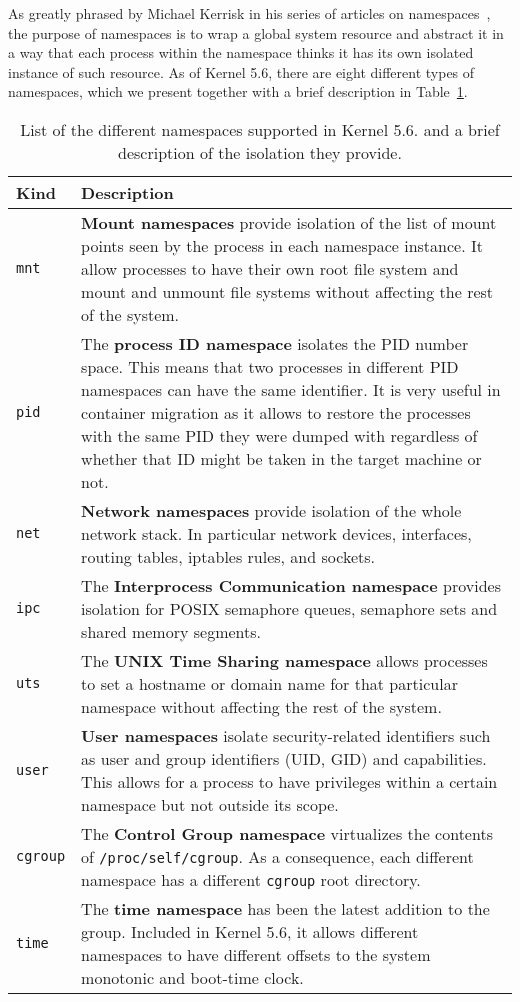As greatly phrased by Michael Kerrisk in his series of articles on namespaces~\cite{Kerrisk2013}, the purpose of namespaces is to wrap a global system resource and abstract it in a way that each process within the namespace thinks it has its own isolated instance of such resource.
As of Kernel 5.6, there are eight different types of namespaces, which we present together with a brief description in Table~\ref{table:namespaces}.
\begin{table}[h!]
    \centering
    \begin{tabular}{p{2cm}p{13cm}}
        \hline
        \textbf{Kind} & \textbf{Description} \\[3pt]
        \hline \hline
        \texttt{mnt} & \textbf{Mount namespaces} provide isolation of the list of mount points seen by the process in each namespace instance. It allow processes to have their own root file system and mount and unmount file systems without affecting the rest of the system. \\[3pt]
        \texttt{pid} & The \textbf{process ID namespace} isolates the PID number space. This means that two processes in different PID namespaces can have the same identifier. It is very useful in container migration as it allows to restore the processes with the same PID they were dumped with regardless of whether that ID might be taken in the target machine or not. \\[3pt]
        \texttt{net} & \textbf{Network namespaces} provide isolation of the whole network stack. In particular network devices, interfaces, routing tables, iptables rules, and sockets. \\[3pt]
        \texttt{ipc} & The \textbf{Interprocess Communication namespace} provides isolation for POSIX semaphore queues, semaphore sets and shared memory segments.\\[3pt]
        \texttt{uts} & The \textbf{UNIX Time Sharing namespace} allows processes to set a hostname or domain name for that particular namespace without affecting the rest of the system. \\[3pt]
        \texttt{user} & \textbf{User namespaces} isolate security-related identifiers such as user and group identifiers (UID, GID) and capabilities. This allows for a process to have privileges within a certain namespace but not outside its scope. \\[3pt]
        \texttt{cgroup} & The \textbf{Control Group namespace} virtualizes the contents of \texttt{/proc/self/cgroup}. As a consequence, each different namespace has a different \texttt{cgroup} root directory.\\[3pt]
        \texttt{time} & The \textbf{time namespace} has been the latest addition to the group. Included in Kernel 5.6, it allows different namespaces to have different offsets to the system monotonic and boot-time clock.\\[3pt]
        \hline
    \end{tabular}
    \caption[List of the different namespaces supported in Kernel 5.6.]{List of the different namespaces supported in Kernel 5.6. and a brief description of the isolation they provide.\label{table:namespaces}}
\end{table}
